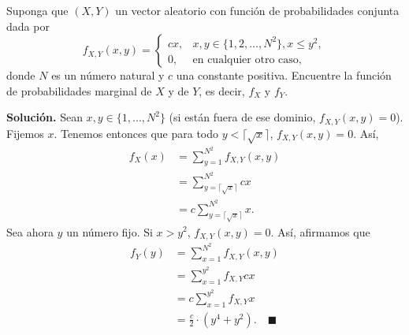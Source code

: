 \documentclass[11pt]{scrartcl}
\begin{document}
\begin{mdframed}[style=mdpurplebox, frametitle={Ejercicio 07 *, Tarea 01, Probabilidad}]
    Suponga que $(X,Y)$ un vector aleatorio con función de probabilidades conjunta dada por
    \[
    f_{X,Y}(x,y)=
    \begin{cases}
        cx, &x,y \in \{1,2,\ldots,N^2\}, x\leq y^2, \\
        0,  &\text{en cualquier otro caso,}
    \end{cases}
    \]
    donde $N$ es un número natural y $c$ una constante positiva. Encuentre la función de probabilidades marginal de $X$ y de $Y$,
    es decir, $f_X$ y $f_Y$.
\end{mdframed}
\textbf{Solución.} Sean $x,y \in \{1,...,N^2\}$ (si están fuera de ese dominio, $f_{X,Y}(x,y)=0$). Fijemos $x$. Tenemos entonces que para todo $y<\lceil\sqrt{x}\rceil$, $f_{X,Y}(x,y)=0$. Así,
\begin{align*}
    f_X(x) &= \sum_{y=1}^{N^2}f_{X,Y}(x,y) \\
    &= \sum_{y=\lceil\sqrt{x}\rceil}^{N^2}cx \\
    &= c\sum_{y=\lceil\sqrt{x}\rceil}^{N^2}x. 
\end{align*}
Sea ahora $y$ un número fijo. Si $x>y^2$, $f_{X,Y}(x,y)=0$. Así, afirmamos que
\begin{align*}
    f_Y(y) &= \sum_{x=1}^{N^2}f_{X,Y}(x,y) \\
    &= \sum_{x=1}^{y^2}f_{X,Y}cx \\
    &= c\sum_{x=1}^{y^2}f_{X,Y}x \\
    &= \frac{c}{2}\cdot (y^4+y^2). \quad \blacksquare
\end{align*}
\end{document}

